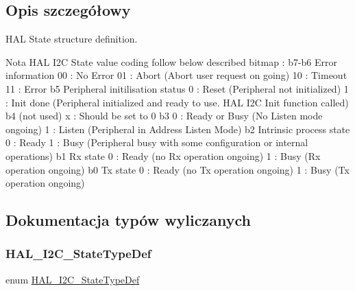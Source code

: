 \subsection{Opis szczegółowy}
H\+AL State structure definition. 

\begin{DoxyNote}{Nota}
H\+AL I2C State value coding follow below described bitmap \+: b7-\/b6 Error information 00 \+: No Error 01 \+: Abort (Abort user request on going) 10 \+: Timeout 11 \+: Error b5 Peripheral initilisation status 0 \+: Reset (Peripheral not initialized) 1 \+: Init done (Peripheral initialized and ready to use. H\+AL I2C Init function called) b4 (not used) x \+: Should be set to 0 b3 0 \+: Ready or Busy (No Listen mode ongoing) 1 \+: Listen (Peripheral in Address Listen Mode) b2 Intrinsic process state 0 \+: Ready 1 \+: Busy (Peripheral busy with some configuration or internal operations) b1 Rx state 0 \+: Ready (no Rx operation ongoing) 1 \+: Busy (Rx operation ongoing) b0 Tx state 0 \+: Ready (no Tx operation ongoing) 1 \+: Busy (Tx operation ongoing) 
\end{DoxyNote}


\subsection{Dokumentacja typów wyliczanych}
\mbox{\label{group___h_a_l__state__structure__definition_gaef355af8eab251ae2a19ee164ad81c37}} 
\subsubsection{\texorpdfstring{H\+A\+L\+\_\+\+I2\+C\+\_\+\+State\+Type\+Def}{HAL\_I2C\_StateTypeDef}}
{\footnotesize\ttfamily enum \hyperlink{group___h_a_l__state__structure__definition_gaef355af8eab251ae2a19ee164ad81c37}{H\+A\+L\+\_\+\+I2\+C\+\_\+\+State\+Type\+Def}}

